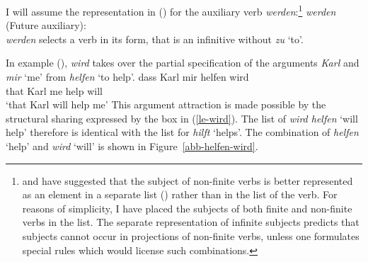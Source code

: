 {{I will assume the representation in () for the auxiliary verb \emph{werden}:\footnote{\label{subj-fn}%
	 \citet{Pollard90a} and \citet*{Kiss92} have suggested that the subject of non-finite verbs is better represented
	 as an element in a separate list (\subj) rather than in the \comps list of the verb. For reasons of simplicity,
	 I have placed the subjects of both finite and non-finite verbs in the \comps list. The separate representation of infinite
	 subjects predicts that subjects cannot occur in projections of non-finite verbs, unless one formulates special rules which would
	 license such combinations.%
}
\eas
\label{le-wird}
\emph{werden} (Future auxiliary):\\
\zs
\emph{werden} selects a verb in its  form, that is an infinitive without \emph{zu} `to'.

In example (), \emph{wird} takes over the partial specification of the arguments \emph{Karl} and
\emph{mir} `me' from \emph{helfen} `to help'.
\ea
\gll dass Karl mir helfen wird\\
	 that Karl me help will\\
\glt `that Karl will help me'
\z
This argument attraction is made possible by the structural sharing expressed by the box 
in (\ref{le-wird}). The \comps list of \emph{wird helfen} `will help' therefore is identical
with  the \comps list for \emph{hilft} `helps'. The combination of \emph{helfen} `help' and
 \emph{wird} `will' is shown in Figure~\vref{abb-helfen-wird}. 

}}
